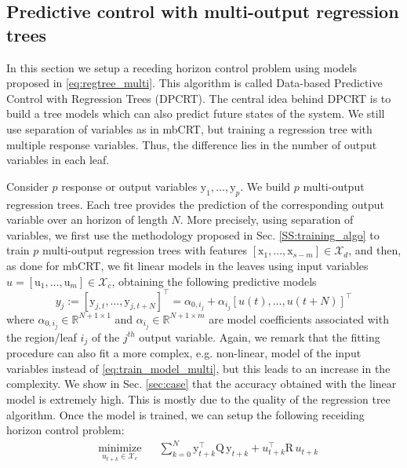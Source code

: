 \subsection{Predictive control with multi-output regression trees}
\label{SS:control_tree}
\textcolor[rgb]{1.00,0.00,0.00}{In this section we setup a receding horizon control problem using models proposed in \eqref{eq:regtree_multi}. This algorithm is called Data-based Predictive Control with Regression Trees (DPCRT). The central idea behind DPCRT is to build a tree models which can also predict future states of the system. We still use separation of variables as in mbCRT, but training a regression tree with multiple response variables. Thus, the difference lies in the number of output variables in each leaf.}

\textcolor[rgb]{0.00,0.00,1.00}{Consider $p$ response or output variables $\mathrm{y}_1,\ldots,\mathrm{y}_p$. We build $p$ multi-output regression trees. Each tree provides the prediction of the corresponding output variable over an horizon of length $N$. More precisely, using separation of variables, we first use the methodology proposed in Sec. \ref{SS:training_algo} to train $p$ multi-output regression trees with features $[\mathrm{x}_1,\ldots,\mathrm{x}_{s-m}]\in\mathcal{X}_d$, and then, as done for mbCRT, we fit linear models in the leaves using input variables $u=[\mathrm{u}_1,\ldots,\mathrm{u}_{m}]\in\mathcal{X}_c$, obtaining the following predictive models
\begin{equation}\label{eq:train_model_multi}
y_j := [\mathrm{y}_{j,t}, \ldots, \mathrm{y}_{j,t+N}]^\top = \alpha_{0,i_j} + \alpha_{i_j} [u(t),\ldots,u(t+N)]^\top
\end{equation}
where $\alpha_{0,i_j}\in\mathbb{R}^{N+1\times 1}$ and $\alpha_{i_j}\in\mathbb{R}^{N+1\times m}$ are model coefficients associated with the region/leaf $i_j$ of the $j^{th}$ output variable. Again, we remark that the fitting procedure can also fit a more complex, e.g. non-linear, model of the input variables instead of \eqref{eq:train_model_multi}, but this leads to an increase in the complexity. We show in Sec. \ref{sec:case} that the accuracy obtained with the linear model is extremely high. This is mostly due to the quality of the regression tree algorithm. Once the model is trained, we can setup the following receiding horizon control problem:
\begin{equation}\label{eq:DPCRT}
\begin{aligned}
& \underset{u_{t+k} \in \mathcal{X}_c}{\text{minimize}} & &  \sum_{k=0}^{N}{\mathrm{y}^\top_{t+k} \mathrm{Q}\, \mathrm{y}_{t+k} + u^\top_{t+k} \mathrm{R}\, u_{t+k}}  \\

\end{aligned}
\end{equation}}
